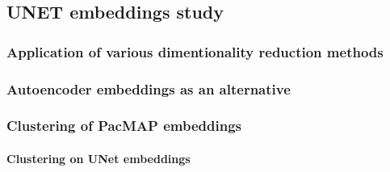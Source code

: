 \subsection{UNET embeddings study}
    \subsubsection{Application of various dimentionality reduction methods}
        
    \subsubsection{Autoencoder embeddings as an alternative}
        
    \clearpage
    \subsubsection{Clustering of PacMAP embeddings}
        \paragraph{Clustering on UNet embeddings}
        